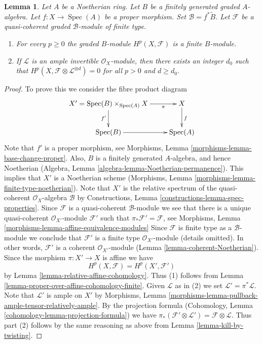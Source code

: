 \documentclass{stacks-project}
\theoremstyle{plain}
\newtheorem{lemma}[subsection]{Lemma}
\theoremstyle{definition}
\theoremstyle{remark}
\numberwithin{equation}{subsection}
\def\Spec{\mathop{\mathrm{Spec}}}
\begin{document}
\begin{lemma}
\label{lemma-graded-finiteness}
Let $A$ be a Noetherian ring.
Let $B$ be a finitely generated graded $A$-algebra.
Let $f : X \to \Spec(A)$ be a proper morphism.
Set $\mathcal{B} = f^*\widetilde B$.
Let $\mathcal{F}$ be a quasi-coherent
graded $\mathcal{B}$-module of finite type.
\begin{enumerate}
\item For every $p \geq 0$ the graded $B$-module $H^p(X, \mathcal{F})$
is a finite $B$-module.
\item If $\mathcal{L}$ is an ample invertible $\mathcal{O}_X$-module,
then there exists an integer $d_0$ such that
$H^p(X, \mathcal{F} \otimes \mathcal{L}^{\otimes d}) = 0$
for all $p > 0$ and $d \geq d_0$.
\end{enumerate}
\end{lemma}

\begin{proof}
To prove this we consider the fibre product diagram
$$
\xymatrix{
X' = \Spec(B) \times_{\Spec(A)} X
\ar[r]_-\pi \ar[d]_{f'} &
X \ar[d]^f \\
\Spec(B) \ar[r] &
\Spec(A)
}
$$
Note that $f'$ is a proper morphism, see
Morphisms, Lemma \ref{morphisms-lemma-base-change-proper}.
Also, $B$ is a finitely generated $A$-algebra, and hence
Noetherian (Algebra, Lemma \ref{algebra-lemma-Noetherian-permanence}).
This implies that $X'$ is a Noetherian scheme
(Morphisms, Lemma \ref{morphisms-lemma-finite-type-noetherian}).
Note that $X'$ is the relative spectrum of the quasi-coherent
$\mathcal{O}_X$-algebra $\mathcal{B}$ by
Constructions, Lemma \ref{constructions-lemma-spec-properties}.
Since $\mathcal{F}$ is a quasi-coherent $\mathcal{B}$-module
we see that there is a unique quasi-coherent
$\mathcal{O}_{X'}$-module $\mathcal{F}'$ such that
$\pi_*\mathcal{F}' = \mathcal{F}$, see
Morphisms, Lemma \ref{morphisms-lemma-affine-equivalence-modules}
Since $\mathcal{F}$ is finite type as a $\mathcal{B}$-module we
conclude that $\mathcal{F}'$ is a finite type
$\mathcal{O}_{X'}$-module (details omitted). In other words,
$\mathcal{F}'$ is a coherent $\mathcal{O}_{X'}$-module
(Lemma \ref{lemma-coherent-Noetherian}).
Since the morphism $\pi : X' \to X$ is affine we have
$$
H^p(X, \mathcal{F}) = H^p(X', \mathcal{F}')
$$
by Lemma \ref{lemma-relative-affine-cohomology}.
Thus (1) follows from
Lemma \ref{lemma-proper-over-affine-cohomology-finite}.
Given $\mathcal{L}$ as in (2) we set
$\mathcal{L}' = \pi^*\mathcal{L}$. Note that $\mathcal{L}'$ is
ample on $X'$ by
Morphisms, Lemma \ref{morphisms-lemma-pullback-ample-tensor-relatively-ample}.
By the projection formula
(Cohomology, Lemma \ref{cohomology-lemma-projection-formula}) we have
$\pi_*(\mathcal{F}' \otimes \mathcal{L}') = \mathcal{F} \otimes \mathcal{L}$.
Thus part (2) follows by the same reasoning as above from
Lemma \ref{lemma-kill-by-twisting}.
\end{proof}
\end{document}
